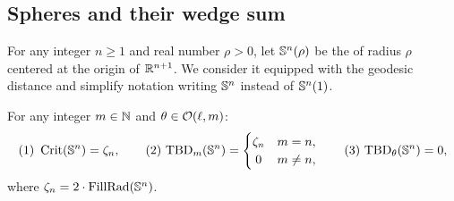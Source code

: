 
\subsection{Spheres and their wedge sum }\label{ss:Sn}\label{subsub:critical values of Sn}

For any integer $n \geq 1$ and real number $\rho > 0$, let $\mathbb{S}^n(\rho)$ be the  of radius $\rho$ centered at the origin of $\mathbb{R}^{n+1}$.
We consider it equipped with the geodesic distance and simplify notation writing \(\mathbb{S}^n\) instead of \(\mathbb{S}^n(1)\).


\medskip\proposition
For any integer $m \in \mathbb{N}$ and $\theta \in \mathcal{O}(\ell, m)$:
\[
\mathrm{(1)}\ \crit(\bS^n) = \zeta_n,
\qquad
\mathrm{(2)}\ \firstdeath{m}{\bS^n} =
\begin{cases}
	\zeta_n & m = n, \\
	\hfil 0 & m \neq n,
\end{cases}
\qquad
\mathrm{(3)}\ \firstdeath{\theta}{\bS^n} = 0,
\]
where \(\zeta_n = 2 \cdot \operatorname{FillRad}(\mathbb{S}^n)\).

